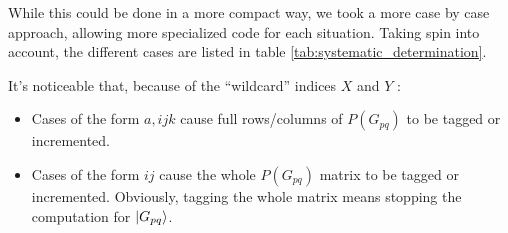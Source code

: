 \documentclass[./thesis.tex]{subfiles}
\begin{document}
While this could be done in a more compact way, we took a more case by case approach, allowing more specialized code for each situation. Taking spin into account, the different cases are listed in table \ref{tab:systematic_determination}.


It's noticeable that, because of the ``wildcard'' indices $X$ and $Y$ :
\begin{itemize}

\item
Cases of the form $a,ijk$ cause full rows/columns of $P(G_{pq})$ to be tagged or incremented.
\item
Cases of the form $ij$ cause the whole $P(G_{pq})$ matrix to be tagged or incremented. Obviously, tagging the whole matrix means stopping the computation for $\ket {G_{pq}}$.
\end{itemize}
\end{document}
